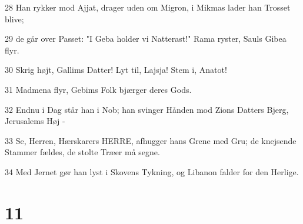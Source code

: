 \par 28 Han rykker mod Ajjat, drager uden om Migron, i Mikmas lader han Trosset blive;
\par 29 de går over Passet: "I Geba holder vi Natterast!" Rama ryster, Sauls Gibea flyr.
\par 30 Skrig højt, Gallims Datter! Lyt til, Lajsja! Stem i, Anatot!
\par 31 Madmena flyr, Gebims Folk bjærger deres Gods.
\par 32 Endnu i Dag står han i Nob; han svinger Hånden mod Zions Datters Bjerg, Jerusalems Høj -
\par 33 Se, Herren, Hærskarers HERRE, afhugger hans Grene med Gru; de knejsende Stammer fældes, de stolte Træer må segne.
\par 34 Med Jernet gør han lyst i Skovens Tykning, og Libanon falder for den Herlige.

\chapter{11}

